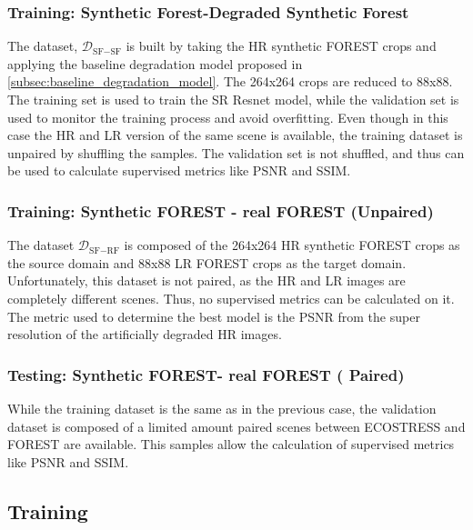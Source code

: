         \subsubsection{Training: Synthetic Forest-Degraded Synthetic Forest}
            The dataset, $\mathcal{D}_{\text{SF}-\text{SF}}$ is built by taking the HR synthetic FOREST crops and applying the baseline degradation model proposed in \ref{subsec:baseline_degradation_model}. 
            The 264x264 crops are reduced to 88x88. The training set is used to train the SR Resnet model, while the validation set is used to monitor the training process and avoid overfitting. 
            Even though in this case the HR and LR version of the same scene is available, the training dataset is unpaired by shuffling the samples.
            The validation set is not shuffled, and thus can be used to calculate supervised metrics like PSNR and SSIM.
        
        \subsubsection{Training: Synthetic FOREST - real FOREST (Unpaired)}
            The dataset $\mathcal{D}_{\text{SF}-\text{RF}}$ is composed of the 264x264 HR synthetic FOREST crops as the source domain and  88x88 LR FOREST crops as the target domain. 
            Unfortunately, this dataset is not paired, as the HR and LR images are completely different scenes.
            Thus, no supervised metrics can be calculated on it. The metric used to determine the best model is the PSNR from the super resolution of the artificially degraded HR images.
        
        \subsubsection{Testing: Synthetic FOREST- real FOREST ( Paired)}
            While the training dataset is the same as in the previous case, the validation dataset is composed of a limited amount paired scenes between ECOSTRESS and FOREST are available.
             This samples allow the calculation of supervised metrics like PSNR and SSIM.

    \subsection{Training}

\clearpage

